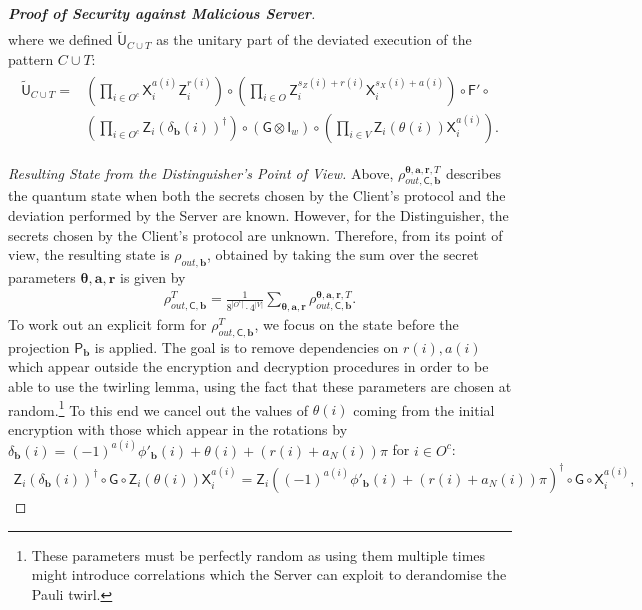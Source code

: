 \documentclass[12pt]{iopart}
\newcommand{\cptp}[1]{\mathsf{#1}} \newcommand{\pd}[1]{\mathcal{#1}}  \newcommand{\sch}[1]{\bm{#1}}
\newcommand{\Id}{\cptp{I}}
\newcommand{\X}{\cptp{X}}
\newcommand{\Z}{\cptp{Z}}
\renewcommand{\1}{\mathds{1}}
\newcommand{\TP}{C\cup T}
\begin{document}
\begin{proof}[\bf Proof of Security against Malicious Server]
\begin{align}
\end{align}
where we defined $\tilde{\cptp U}_{\TP}$ as the unitary part of the deviated execution of the pattern $\TP$:
\begin{align}
\begin{split}
\tilde{\cptp U}_{\TP} = &\left(\prod_{i \in O^c} \X^{a(i)}_i\Z^{r(i)}_i\right) \circ \left(\prod_{i \in O}\Z_i^{s_Z(i) + r(i)}\X_i^{s_X(i) + a(i)}\right) \circ \cptp F' \circ \\
&\left(\prod_{i \in O^c}\Z_i(\delta_{\bm{b}}(i))^\dagger\right) \circ (\cptp G \otimes \Id_w) \circ \left(\prod_{i \in V} \Z_i(\theta(i))\X^{a(i)}_i\right).
\end{split}
\end{align}

\textit{Resulting State from the Distinguisher's Point of View.}
Above, $\rho_{out, \cptp C, \bm{b}}^{\bm{\theta},\bm{a}, \bm{r}, T}$ describes the quantum state when both the secrets chosen by the Client's protocol and the deviation performed by the Server are known. However, for the Distinguisher, the secrets chosen by the Client's protocol are unknown. Therefore, from its point of view, the resulting state is $\rho_{out, \bm{b}}$, obtained by taking the sum over the secret parameters $\bm{\theta}, \bm{a}, \bm{r}$ is given by
\begin{align}
\rho_{out, \cptp C, \bm{b}}^T = \frac{1}{8^{|O^c|} \cdot 4^{|V|}} \sum_{\bm{\theta},\bm{a}, \bm{r}} \rho_{out, \cptp C, \bm{b}}^{\bm{\theta},\bm{a}, \bm{r}, T}.
\end{align}
To work out an explicit form for $\rho_{out, \cptp C, \bm{b}}^T$, we focus on the state before the projection $\cptp P_{\bm{b}}$ is applied.
The goal is to remove dependencies on $r(i), a(i)$ which appear outside the encryption and decryption procedures in order to be able to use the twirling lemma, using the fact that these parameters are chosen at random.\footnote{These parameters must be perfectly random as using them multiple times might introduce correlations which the Server can exploit to derandomise the Pauli twirl.} To this end we cancel out the values of $\theta(i)$ coming from the initial encryption with those which appear in the rotations by $\delta_{\bm{b}}(i) = (-1)^{a(i)}\phi'_{\bm{b}}(i) + \theta(i) + (r(i) + a_N(i)) \pi$ for $i \in O^c$:
\begin{align}
\Z_i(\delta_{\bm{b}}(i))^\dagger \circ\cptp G\circ \Z_i(\theta(i))\X^{a(i)}_i = \Z_i((-1)^{a(i)}\phi'_{\bm{b}}(i) + (r(i) + a_N(i)) \pi)^\dagger\circ \cptp G\circ \X^{a(i)}_i,
\end{align}

\end{proof}
\end{document}
